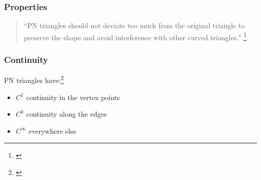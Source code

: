 
\begin{frame}\frametitle{Properties}
	\begin{quote}
		``PN triangles should not deviate too much from the original triangle to preserve the shape and avoid interference with other curved triangles."
		\footnote{\citeauthor{vlachos2001curved}}
	\end{quote}
	\note{\textbf{[Rick]}}
\end{frame}

\begin{frame}\frametitle{Continuity}	
	PN triangles have:\footnote{\citeauthor{jiao2005parallel}}
	\begin{itemize}
		\item $C^1$ continuity in the vertex points
		\item $C^0$ continuity along the edges
		\item $C^\infty$ everywhere else
	\end{itemize}
	\note{\textbf{[Rick]}}
\end{frame}

